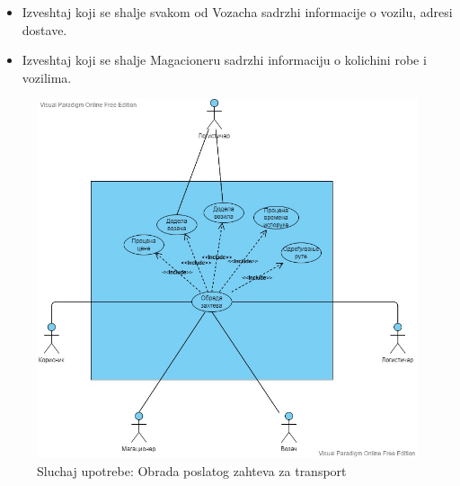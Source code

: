 \begin{enumerate}
\begin{itemize}
                \item Izveshtaj koji se shalje svakom od Vozacha sadrzhi informacije o vozilu, adresi dostave.
                
                \item Izveshtaj koji se shalje Magacioneru sadrzhi informaciju o kolichini robe i vozilima.
                
                
            \end{itemize}
\end{enumerate}

\newpage

\begin{figure}[h!]
    \includegraphics[scale=0.5]{Slike/UML/SUobrada.jpg}
    \centering
    \caption{Sluchaj upotrebe: Obrada poslatog zahteva za transport}
    \label{dsuobradazahteva}
\end{figure}    


